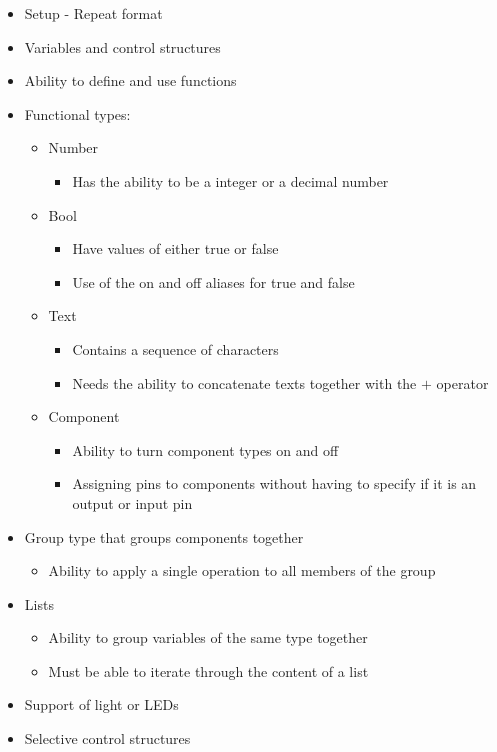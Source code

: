 \begin{itemize}
    \item Setup - Repeat format
    \item Variables and control structures
    \item Ability to define and use functions
    \item Functional types:
    \begin{itemize}
        \item Number
        \begin{itemize}
            \item Has the ability to be a integer or a decimal number
        \end{itemize}
        \item Bool
        \begin{itemize}
            \item Have values of either true or false
            \item Use of the on and off aliases for true and false
        \end{itemize}
        \item Text
        \begin{itemize}
            \item Contains a sequence of characters
            \item Needs the ability to concatenate texts together with the $+$ operator
        \end{itemize}
        \item Component
        \begin{itemize}
            \item Ability to turn component types on and off
            \item Assigning pins to components without having to specify if it is an output or input pin
        \end{itemize}
    \end{itemize}
    \item Group type that groups components together
        \begin{itemize}
            \item Ability to apply a single operation to all members of the group
        \end{itemize}
    \item Lists
        \begin{itemize}
            \item Ability to group variables of the same type together
            \item Must be able to iterate through the content of a list
        \end{itemize}
    \item Support of light or LEDs
    \item Selective control structures
\end{itemize}


